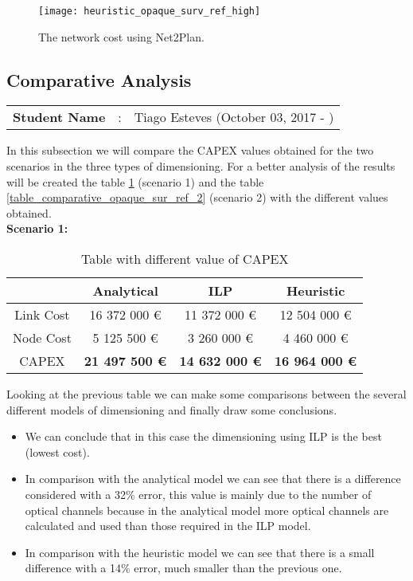 \begin{figure}[h!]
\centering
\texttt{[image: heuristic\_opaque\_surv\_ref\_high]}
\caption{The network cost using Net2Plan.}
\label{heuristicopaque_surv_ref_high}
\end{figure}


\subsection{Comparative Analysis}
\begin{tcolorbox}	
\begin{tabular}{p{2.75cm} p{0.2cm} p{10.5cm}} 	
\textbf{Student Name}  &:& Tiago Esteves    (October 03, 2017 - )\\
\end{tabular}
\end{tcolorbox}

\vspace{11pt}
In this subsection we will compare the CAPEX values obtained for the two scenarios in the three types of dimensioning. For a better analysis of the results will be created the table \ref{table_comparative_opaque_sur_ref_1} (scenario 1) and the table \ref{table_comparative_opaque_sur_ref_2} (scenario 2) with the different values obtained.\\

\textbf{Scenario 1:}\\

\begin{table}[h!]
\centering
\begin{tabular}{| c | c | c | c |}
 \hline
   & Analytical & ILP & Heuristic \\
 \hline\hline
 Link Cost & 16 372 000 \euro & 11 372 000 \euro & 12 504 000 \euro \\
 Node Cost & 5 125 500 \euro & 3 260 000 \euro & 4 460 000 \euro \\
 CAPEX & \textbf{21 497 500 \euro} & \textbf{14 632 000 \euro} & \textbf{16 964 000 \euro} \\
 \hline
\end{tabular}
\caption{Table with different value of CAPEX }
\label{table_comparative_opaque_sur_ref_1}
\end{table}

\vspace{11pt}
Looking at the previous table we can make some comparisons between the several different models of dimensioning and finally draw some conclusions.

\begin{itemize}
  \item We can conclude that in this case the dimensioning using ILP is the best (lowest cost).
  \item In comparison with the analytical model we can see that there is a difference considered with a 32\% error, this value is mainly due to the number of optical channels because in the analytical model more optical channels are calculated and used than those required in the ILP model.
  \item In comparison with the heuristic model we can see that there is a small difference with a 14\% error, much smaller than the previous one.
\end{itemize}


